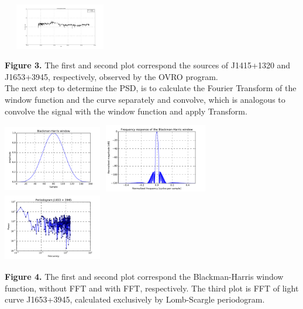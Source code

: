 \documentclass[a0paper,portrait]{baposter}
\begin{document}
\begin{poster}
{\begin{center}
\includegraphics [height=20mm, width=50mm] {curvaJ1653.jpg}
\end{center}
\small{\textbf{Figure 3.} The first and second plot correspond the sources of J1415+1320 and J1653+3945, respectively, observed by the OVRO program.}\\
The next step to determine the PSD, is to calculate the Fourier Transform of the window function and the curve separately and convolve, which is analogous to convolve the signal with the window function and apply Transform.
\begin{center}
\includegraphics [height=30mm, width=43mm] {BH.pdf}
\hspace{.3cm}
\includegraphics [height=30mm, width=48mm] {FFTBH.pdf}
\hspace{.3cm}
\includegraphics [height=30mm, width=43mm] {FFTcurva_2.pdf}
\end{center}
\small{\textbf{Figure 4.} The first and second plot correspond the  Blackman-Harris window function, without FFT and with FFT, respectively. The third plot is FFT of light curve J1653+3945, calculated exclusively by Lomb-Scargle periodogram.}
}


\end{poster}
\end{document}
